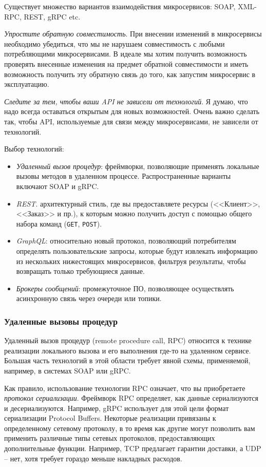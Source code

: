 \documentclass[%
	11pt,
	a4paper,
	utf8,
		]{article}
\begin{document}
Существует множество вариантов взаимодействия микросервисов: SOAP, XML-RPC, REST, gRPC etc.

\emph{Упростите обратную совместимость}. При внесении изменений в микросервисы необходимо убедиться, что мы не нарушаем совместимость с любыми потребляющими микросервисами. В идеале мы хотим получить возможность проверять внесенные изменения на предмет обратной совместимости и иметь возможность получить эту обратную связь до того, как запустим микросервис в эксплуатацию.

\emph{Следите за тем, чтобы ваши API не зависели от технологий}. Я думаю, что надо всегда оставаться открытым для новых возможностей. Очень важно сделать так, чтобы API, используемые для связи между микросервисами, не зависели от технологий.

Выбор технологий:
\begin{itemize}
	\item \emph{Удаленный вызов процедур}: фреймворки, позволяющие применять локальные вызовы методов в удаленном процессе. Распространенные варианты включают SOAP и gRPC.
	
	\item \emph{REST}. архитектурный стиль, где вы предоставляете ресурсы (<<Клиент>>, <<Заказ>> и пр.), к которым можно получить доступ с помощью общего набора команд (\verb|GET|, \verb|POST|).
	
	\item \emph{GraphQL}: относительно новый протокол, позволяющий потребителям определять пользовательские запросы, которые будут извлекать информацию из нескольких нижестоящих микросервисов, фильтруя результаты, чтобы возвращать только требующиеся данные.
	
	\item \emph{Брокеры сообщений}: промежуточное ПО, позволяющее осуществлять асинхронную связь через очереди или топики.
\end{itemize}

\subsubsection{Удаленные вызовы процедур}

Удаленный вызов процедур (remote procedure call, RPC) относится к технике реализации локального вызова и его выполнения где-то на удаленном сервисе. Большая часть технологий в этой области требует явной схемы, применяемой, например, в системах SOAP или gRPC.

Как правило, использование технологии RPC означает, что вы приобретаете \emph{протокол сериализации}. Фреймворк RPC определяет, как данные сериализуются и десериализуются. Например, gRPC использует для этой цели формат сериализации Protocol Buffers. Некоторые реализации привязаны к определенному сетевому протоколу, в то время как другие могут позволить вам применить различные типы сетевых протоколов, предоставляющих дополнительные функции. Например, TCP предлагает гарантии доставки, а UDP -- нет, хотя требует гораздо меньше накладных расходов. 
\end{document}
